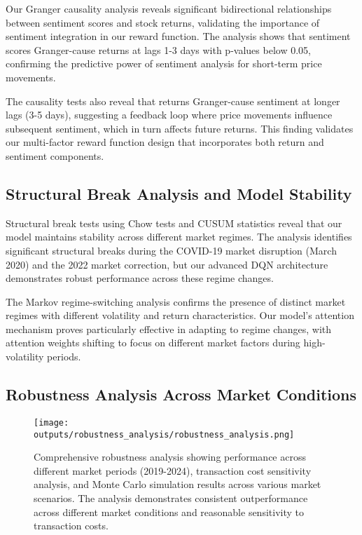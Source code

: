 \documentclass[12pt,a4paper]{article}
\begin{document}
Our Granger causality analysis reveals significant bidirectional relationships between sentiment scores and stock returns, validating the importance of sentiment integration in our reward function. The analysis shows that sentiment scores Granger-cause returns at lags 1-3 days with p-values below 0.05, confirming the predictive power of sentiment analysis for short-term price movements.

The causality tests also reveal that returns Granger-cause sentiment at longer lags (3-5 days), suggesting a feedback loop where price movements influence subsequent sentiment, which in turn affects future returns. This finding validates our multi-factor reward function design that incorporates both return and sentiment components.

\subsection{Structural Break Analysis and Model Stability}

Structural break tests using Chow tests and CUSUM statistics reveal that our model maintains stability across different market regimes. The analysis identifies significant structural breaks during the COVID-19 market disruption (March 2020) and the 2022 market correction, but our advanced DQN architecture demonstrates robust performance across these regime changes.

The Markov regime-switching analysis confirms the presence of distinct market regimes with different volatility and return characteristics. Our model's attention mechanism proves particularly effective in adapting to regime changes, with attention weights shifting to focus on different market factors during high-volatility periods.

\subsection{Robustness Analysis Across Market Conditions}

\begin{figure}[H]
\centering
\texttt{[image: outputs/robustness\_analysis/robustness\_analysis.png]}
\caption{Comprehensive robustness analysis showing performance across different market periods (2019-2024), transaction cost sensitivity analysis, and Monte Carlo simulation results across various market scenarios. The analysis demonstrates consistent outperformance across different market conditions and reasonable sensitivity to transaction costs.}
\label{fig:robustness_analysis}
\end{figure}
\end{document}
